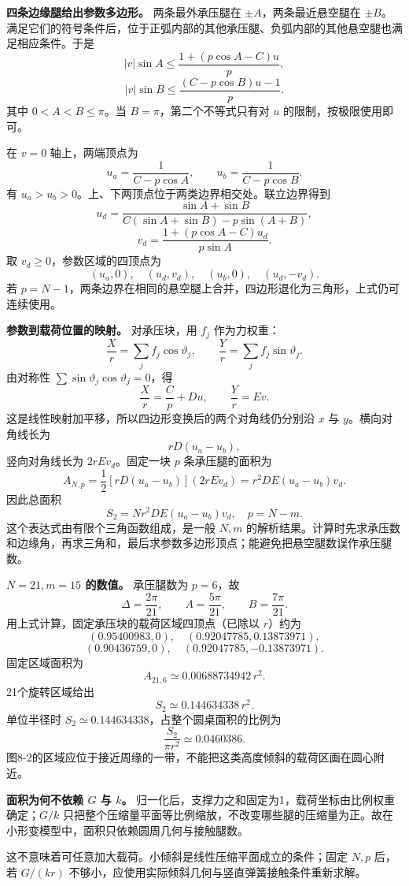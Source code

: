 \documentclass[12pt,a4paper,UTF8]{ctexart}
\begin{document}
\textbf{四条边缘腿给出参数多边形。} 两条最外承压腿在
\(\pm A\)，两条最近悬空腿在
\(\pm B\)。满足它们的符号条件后，位于正弧内部的其他承压腿、负弧内部的其他悬空腿也满足相应条件。于是
\[
|v|\sin A\le\frac{1+(p\cos A-C)u}{p},
\] \[
|v|\sin B\le\frac{(C-p\cos B)u-1}{p}.
\] 其中 \(0<A<B\le\pi\)。当 \(B=\pi\)，第二个不等式只有对 \(u\)
的限制，按极限使用即可。

在 \(v=0\) 轴上，两端顶点为 \[
\boxed{u_a=\frac1{C-p\cos A}},
\qquad
\boxed{u_b=\frac1{C-p\cos B}}.
\] 有 \(u_a>u_b>0\)。上、下两顶点位于两类边界相交处。联立边界得到 \[
\boxed{u_d=
\frac{\sin A+\sin B}
{C(\sin A+\sin B)-p\sin(A+B)}},
\] \[
\boxed{v_d=
\frac{1+(p\cos A-C)u_d}{p\sin A}}.
\] 取 \(v_d\ge0\)，参数区域的四顶点为 \[
(u_a,0),\quad(u_d,v_d),\quad(u_b,0),\quad(u_d,-v_d).
\] 若
\(p=N-1\)，两条边界在相同的悬空腿上合并，四边形退化为三角形，上式仍可连续使用。

\textbf{参数到载荷位置的映射。} 对承压块，用 \(f_j\) 作为力权重： \[
\frac Xr=\sum_j f_j\cos\vartheta_j,
\qquad
\frac Yr=\sum_j f_j\sin\vartheta_j.
\] 由对称性 \(\sum\sin\vartheta_j\cos\vartheta_j=0\)，得 \[
\boxed{\frac Xr=\frac Cp+Du},
\qquad
\boxed{\frac Yr=Ev}.
\] 这是线性映射加平移，所以四边形变换后的两个对角线仍分别沿 \(x\) 与
\(y\)。横向对角线长为 \[
rD(u_a-u_b),
\] 竖向对角线长为 \(2rEv_d\)。固定一块 \(p\) 条承压腿的面积为 \[
A_{N,p}=\frac12[rD(u_a-u_b)](2rEv_d)
=r^2DE(u_a-u_b)v_d.
\] 因此总面积 \[
\boxed{S_2=N r^2DE(u_a-u_b)v_d,\quad p=N-m}.
\] 这个表达式由有限个三角函数组成，是一般 \(N,m\)
的解析结果。计算时先求承压数和边缘角，再求三角和，最后求参数多边形顶点；能避免把悬空腿数误作承压腿数。

\textbf{\(N=21,m=15\) 的数值。} 承压腿数为 \(p=6\)，故 \[
\Delta=\frac{2\pi}{21},\qquad A=\frac{5\pi}{21},\qquad B=\frac{7\pi}{21}.
\] 用上式计算，固定承压块的载荷区域四顶点（已除以 \(r\)）约为 \[
(0.95400983,0),\quad
(0.92047785,0.13873971),
\] \[
(0.90436759,0),\quad
(0.92047785,-0.13873971).
\] 固定区域面积为 \[
A_{21,6}\simeq0.00688734942\,r^2.
\] 21个旋转区域给出 \[
\boxed{S_2\simeq0.144634338\,r^2}.
\] 单位半径时 \(S_2\simeq0.144634338\)，占整个圆桌面积的比例为 \[
\boxed{\frac{S_2}{\pi r^2}\simeq0.0460386}.
\]
图8-2的区域应位于接近周缘的一带，不能把这类高度倾斜的载荷区画在圆心附近。

\textbf{面积为何不依赖 \(G\) 与 \(k\)。}
归一化后，支撑力之和固定为1，载荷坐标由比例权重确定；\(G/k\)
只把整个压缩量平面等比例缩放，不改变哪些腿的压缩量为正。故在小形变模型中，面积只依赖圆周几何与接触腿数。

这不意味着可任意加大载荷。小倾斜是线性压缩平面成立的条件；固定 \(N,p\)
后，若 \(G/(kr)\) 不够小，应使用实际倾斜几何与竖直弹簧接触条件重新求解。
\end{document}
